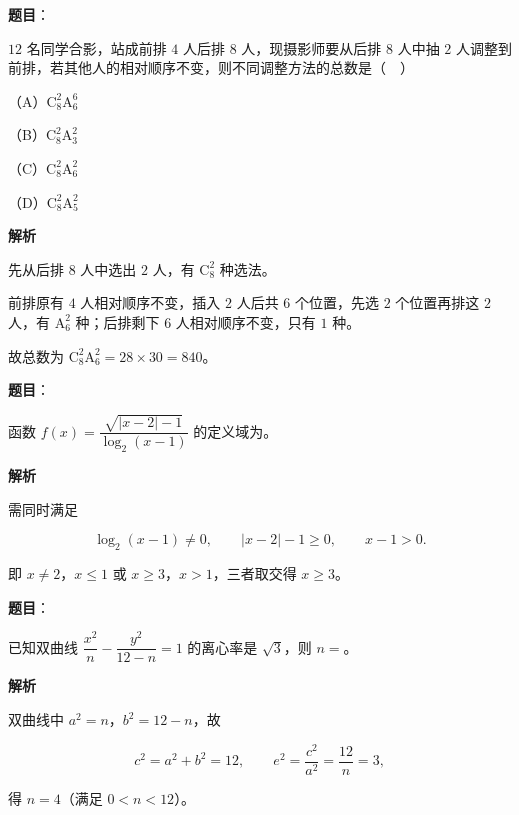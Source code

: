 \begin{answer}

\textbf{题目}：

$12$ 名同学合影，站成前排 $4$ 人后排 $8$ 人，现摄影师要从后排 $8$ 人中抽 $2$ 人调整到前排，若其他人的相对顺序不变，则不同调整方法的总数是（　）

（A）$\mathrm C_8^2\mathrm A_6^6$

（B）$\mathrm C_8^2\mathrm A_3^2$

（C）$\mathrm C_8^2\mathrm A_6^2$

（D）$\mathrm C_8^2\mathrm A_5^2$

\textbf{解析}

先从后排 $8$ 人中选出 $2$ 人，有 $\mathrm C_8^2$ 种选法。

前排原有 $4$ 人相对顺序不变，插入 $2$ 人后共 $6$ 个位置，先选 $2$ 个位置再排这 $2$ 人，有 $\mathrm A_6^2$ 种；后排剩下 $6$ 人相对顺序不变，只有 $1$ 种。

故总数为 $\mathrm C_8^2\mathrm A_6^2=28\times30=840$。


\end{answer}
\begin{answer}

\textbf{题目}：

函数 $f(x)=\dfrac{\sqrt{|x-2|-1}}{\log_2(x-1)}$ 的定义域为\gkblank{}。

\textbf{解析}

需同时满足

\nopagebreak[4]
\[\log_2(x-1)\neq0,\qquad |x-2|-1\geqslant0,\qquad x-1>0.\]

即 $x\neq2$，$x\leqslant1$ 或 $x\geqslant3$，$x>1$，三者取交得 $x\geqslant3$。

\gkanswer{答案：$[3,+\infty)$。}

\end{answer}
\begin{answer}

\textbf{题目}：

已知双曲线 $\dfrac{x^2}{n}-\dfrac{y^2}{12-n}=1$ 的离心率是 $\sqrt3$，则 $n=$\gkblank{}。

\textbf{解析}

双曲线中 $a^2=n$，$b^2=12-n$，故

\nopagebreak[4]
\[c^2=a^2+b^2=12,\qquad e^2=\frac{c^2}{a^2}=\frac{12}n=3,\]

得 $n=4$（满足 $0<n<12$）。


\end{answer}
